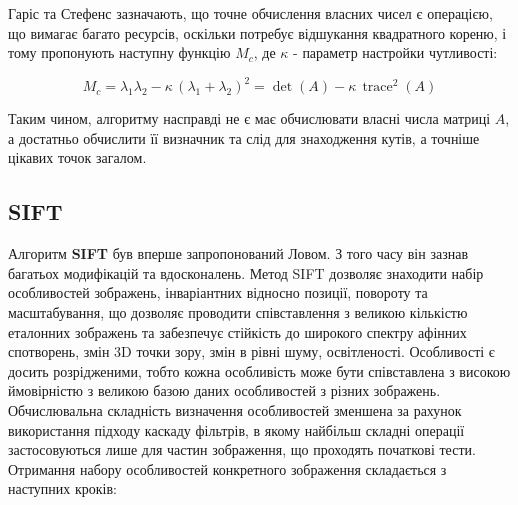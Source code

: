   Гаріс та Стефенс зазначають, що точне обчислення власних чисел є операцією, що вимагає багато ресурсів, оскільки потребує відшукання квадратного кореню, і тому пропонують наступну функцію $M_c$, де $\kappa$ - параметр настройки чутливості:

\begin{equation}
  M_c = \lambda_1 \lambda_2 - \kappa \, (\lambda_1 + \lambda_2)^2 = \operatorname{det}(A) - \kappa \, \operatorname{trace}^2(A) 
\end{equation}

  Таким чином, алгоритму насправді не є має обчислювати власні числа матриці $A$, а достатньо обчислити її визначник та слід для знаходження кутів, а точніше цікавих точок загалом.

\subsection{SIFT}
\label{sec:sift}

Алгоритм \textbf{SIFT} був вперше запропонований Ловом\cite{Lowe2004}. З того часу він зазнав багатьох модифікацій та вдосконалень. Метод SIFT дозволяє знаходити набір особливостей зображень, інваріантних відносно позиції, повороту та масштабування, що дозволяє проводити співставлення з великою кількістю еталонних зображень та забезпечує стійкість до широкого спектру афінних спотворень, змін 3D точки зору, змін в рівні шуму, освітленості. Особливості є досить розрідженими, тобто кожна особливість може бути співставлена з високою ймовірністю з великою базою даних особливостей з різних зображень. Обчислювальна складність визначення особливостей зменшена за рахунок використання підходу каскаду фільтрів, в якому найбільш складні операції застосовуються лише для частин зображення, що проходять початкові тести. Отримання набору особливостей конкретного зображення складається з наступних кроків:

